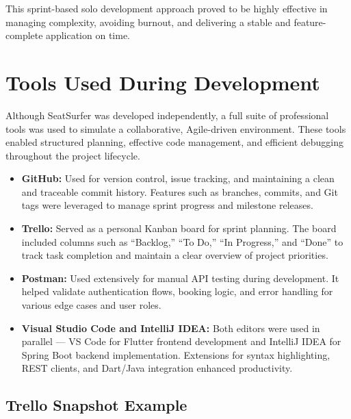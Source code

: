 \documentclass[12pt,a4paper]{report}
\begin{document}
This sprint-based solo development approach proved to be highly effective in managing complexity, avoiding burnout, and delivering a stable and feature-complete application on time.

\section{Tools Used During Development}

Although SeatSurfer was developed independently, a full suite of professional tools was used to simulate a collaborative, Agile-driven environment. These tools enabled structured planning, effective code management, and efficient debugging throughout the project lifecycle.

\begin{itemize}
\item \textbf{GitHub:}
Used for version control, issue tracking, and maintaining a clean and traceable commit history. Features such as branches, commits, and Git tags were leveraged to manage sprint progress and milestone releases.
\item \textbf{Trello:}  
Served as a personal Kanban board for sprint planning. The board included columns such as “Backlog,” “To Do,” “In Progress,” and “Done” to track task completion and maintain a clear overview of project priorities.
\item \textbf{Postman:}  
Used extensively for manual API testing during development. It helped validate authentication flows, booking logic, and error handling for various edge cases and user roles.
\item \textbf{Visual Studio Code and IntelliJ IDEA:}  
Both editors were used in parallel — VS Code for Flutter frontend development and IntelliJ IDEA for Spring Boot backend implementation. Extensions for syntax highlighting, REST clients, and Dart/Java integration enhanced productivity.
\end{itemize}

\subsection*{Trello Snapshot Example}

\end{document}
